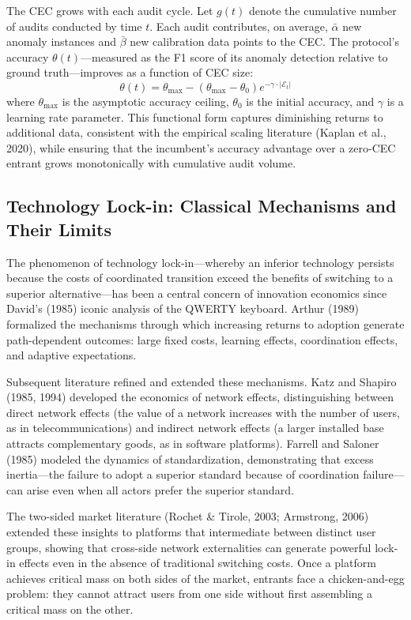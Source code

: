 \documentclass[12pt,a4paper]{ctexart}
\theoremstyle{definition}
\theoremstyle{remark}
\begin{document}
The CEC grows with each audit cycle. Let $g(t)$ denote the cumulative number of audits conducted by time $t$. Each audit contributes, on average, $\bar{\alpha}$ new anomaly instances and $\bar{\beta}$ new calibration data points to the CEC. The protocol's accuracy $\theta(t)$—measured as the F1 score of its anomaly detection relative to ground truth—improves as a function of CEC size:
\begin{equation}
\theta(t) = \theta_{\max} - (\theta_{\max} - \theta_0) e^{-\gamma \cdot |\mathcal{E}_t|}
\end{equation}
where $\theta_{\max}$ is the asymptotic accuracy ceiling, $\theta_0$ is the initial accuracy, and $\gamma$ is a learning rate parameter. This functional form captures diminishing returns to additional data, consistent with the empirical scaling literature (Kaplan et al., 2020), while ensuring that the incumbent's accuracy advantage over a zero-CEC entrant grows monotonically with cumulative audit volume.

\subsection{Technology Lock-in: Classical Mechanisms and Their Limits}

The phenomenon of technology lock-in—whereby an inferior technology persists because the costs of coordinated transition exceed the benefits of switching to a superior alternative—has been a central concern of innovation economics since David's (1985) iconic analysis of the QWERTY keyboard. Arthur (1989) formalized the mechanisms through which increasing returns to adoption generate path-dependent outcomes: large fixed costs, learning effects, coordination effects, and adaptive expectations.

Subsequent literature refined and extended these mechanisms. Katz and Shapiro (1985, 1994) developed the economics of network effects, distinguishing between direct network effects (the value of a network increases with the number of users, as in telecommunications) and indirect network effects (a larger installed base attracts complementary goods, as in software platforms). Farrell and Saloner (1985) modeled the dynamics of standardization, demonstrating that excess inertia—the failure to adopt a superior standard because of coordination failure—can arise even when all actors prefer the superior standard.

The two-sided market literature (Rochet \& Tirole, 2003; Armstrong, 2006) extended these insights to platforms that intermediate between distinct user groups, showing that cross-side network externalities can generate powerful lock-in effects even in the absence of traditional switching costs. Once a platform achieves critical mass on both sides of the market, entrants face a chicken-and-egg problem: they cannot attract users from one side without first assembling a critical mass on the other.
\end{document}
